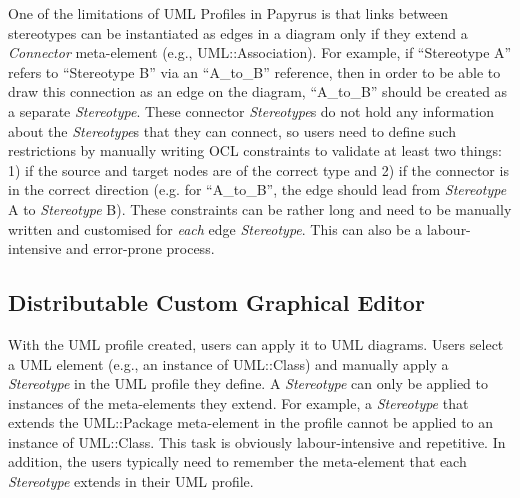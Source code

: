 One of the limitations of UML Profiles in Papyrus is that links between stereotypes can be instantiated as edges in a diagram only if they extend a \textit{Connector} meta-element (e.g., UML::Association).  
For example, if ``Stereotype A'' refers to ``Stereotype B'' via an ``A\_to\_B'' reference, then in order to be able to draw this connection as an edge on the diagram, ``A\_to\_B'' should be created as a separate \textit{Stereotype}. 
These connector \textit{Stereotype}s do not hold any information about the \textit{Stereotype}s that they can connect, so users need to define such restrictions by manually writing OCL constraints to validate at least two things: 1) if the source and target nodes are of the correct type and 2) if the connector is in the correct direction (e.g. for ``A\_to\_B'', the edge should lead from \textit{Stereotype} A to \textit{Stereotype} B). 
These constraints can be rather long and need to be manually written and customised for \textit{each} edge \textit{Stereotype}. This can also be a labour-intensive and error-prone process.

\subsection{Distributable Custom Graphical Editor}
With the UML profile created, users can apply it to UML diagrams. 
Users select a UML element (e.g., an instance of UML::Class) and manually apply a \textit{Stereotype} in the UML profile they define. 
A \textit{Stereotype} can only be applied to instances of the meta-elements they extend.
For example, a \textit{Stereotype} that extends the UML::Package meta-element in the profile cannot be applied to an instance of UML::Class. 
This task is obviously labour-intensive and repetitive. 
In addition, the users typically need to remember the meta-element that each \textit{Stereotype} extends in their UML profile. 

